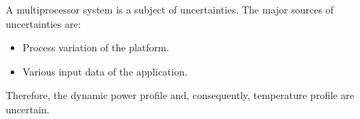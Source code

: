 A multiprocessor system is a subject of uncertainties. The major sources of uncertainties are:
\begin{itemize}
  \item Process variation of the platform.
  \item Various input data of the application.
\end{itemize}
Therefore, the dynamic power profile and, consequently, temperature profile are uncertain.
